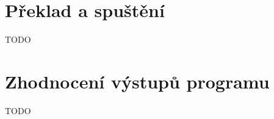 \section{Překlad a spuštění}

TODO

\section{Zhodnocení výstupů programu}\label{Implementation:Results}

TODO\\
          

